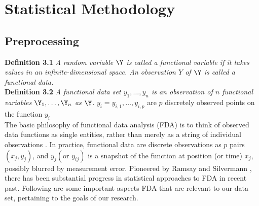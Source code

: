 \section{Statistical Methodology}

\subsection{Preprocessing}
\noindent
{\bf{Definition 3.1}} {\emph{A random variable $\Y$ is called a functional variable if it takes values in an infinite-dimensional space. An observation $Y$ of $\Y$ is called a functional data. \cite{Ferraty_Vieu_2006_Nonparametric}}}\\
\noindent
{\bf{Definition 3.2}} {\emph{A functional data set $y_1, \dots, y_n$ is an observation of $n$ functional variables $\Y_1, \dots, \Y_n$ as $\Y$.}} $y_i = {y_{i,1}, \dots, y_{i,p}}$ are $p$ discretely observed points on the function $y_i$\\

The basic philosophy of functional data analysis (FDA) is to think of observed data functions as single entities, rather than merely as a string of individual observations \cite{Ramsay_2006_Functional}. In
practice, functional data are discrete observations as $p$ pairs $(x_j, y_j)$, and $y_j (\text{or } y_{ij})$ is a snapshot of the function at position (or time) $x_j$, possibly blurred by measurement error. Pioneered by Ramsay and Silvermann \cite{Ramsay_2006_Functional}, there has been substantial progress in statistical approaches to FDA in recent past. Following are some important aspects FDA that are relevant to our data set, pertaining to the goals of our research. 

